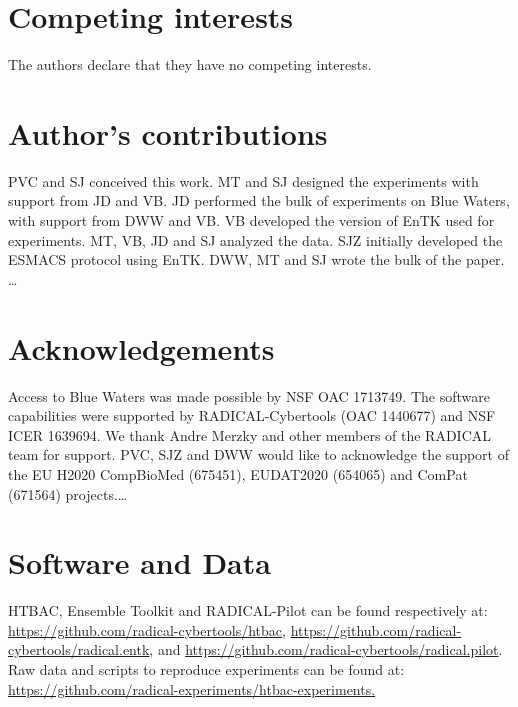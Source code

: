 \documentclass{bmcart}
\begin{document}
\begin{backmatter}

\section*{Competing interests}
The authors declare that they have no competing interests.

\section*{Author's contributions}
PVC and SJ conceived this work. MT and SJ
designed the experiments with support from JD and VB. JD performed the bulk of
experiments on Blue Waters, with support from DWW and VB. VB developed the
version of EnTK used for experiments. MT, VB, JD and SJ analyzed the data. SJZ
initially developed the ESMACS protocol using EnTK. DWW, MT and SJ wrote the
bulk of the paper. \ldots

\section*{Acknowledgements}
Access to Blue Waters was made possible by NSF OAC 1713749. The software
capabilities were supported by RADICAL-Cybertools (OAC 1440677) and NSF ICER
1639694. We thank Andre Merzky and other members of the RADICAL team for
support. PVC, SJZ and DWW would like to acknowledge the support of the EU
H2020 CompBioMed (675451), EUDAT2020 (654065) and ComPat (671564) projects.\ldots

\section*{Software and Data} 
HTBAC, Ensemble Toolkit and
RADICAL-Pilot can be found respectively at:
\url{https://github.com/radical-cybertools/htbac},
\url{https://github.com/radical-cybertools/radical.entk}, and
\url{https://github.com/radical-cybertools/radical.pilot}. Raw data and
scripts to reproduce experiments can be found at:
\url{https://github.com/radical-experiments/htbac-experiments.}

\end{backmatter}



\end{document}
